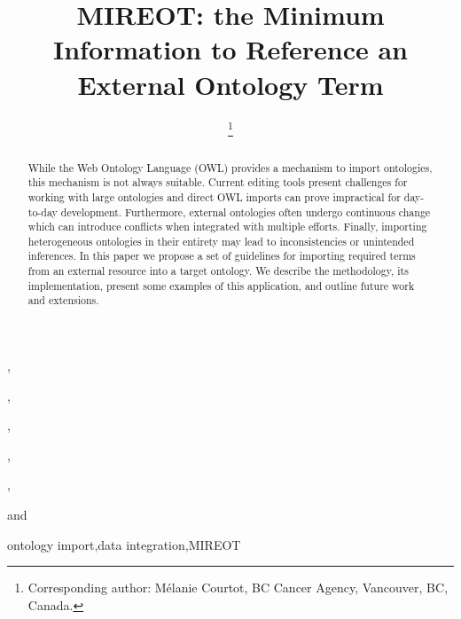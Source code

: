 \documentclass[jou]{ao2e}%
\begin{document}
\begin{frontmatter}                           %
%
\title{ MIREOT: the Minimum Information to Reference an External Ontology Term}

\author[A]{ %
\thanks{Corresponding author: M\'elanie Courtot, BC Cancer Agency, Vancouver, BC, Canada.}},
\author[B]{ },
\author[C]{ },
\author[D]{ },
\author[E]{ },
\author[A]{ }
and
\author[F]{ }

\address[A]{BC Cancer Agency, and Department of Medical Genetics, University of British Columbia, Vancouver, BC, Canada\\
E-mail: mcourtot@gmail.com, rbrinkman@bccrc.ca}

\address[B]{Abcam plc, 332 Cambridge Science Park, Cambridge, CB4 OWN, UK\\
E-mail: fgibson@gmail.com}

\address[C]{CISBAN and School of Computing Science, Newcastle University, Newcastle upon Tyne, UK\\
E-mail: a.l.lister@newcastle.ac.uk}

\address[D]{The European Bioinformatics Institute, Cambridge, CB10 1SD, UK\\
E-mail: malone@ebi.ac.uk}

\address[E]{Institute of Medical Biometry and Medical Informatics (IMBI), University Medical Center, 70104 Freiburg, Germany\\
E-mail: schober@imbi.uni-freiburg.de}

\address[F]{Science Commons, Cambridge, MA, USA\\
E-mail: alanruttenberg@gmail.com}


\begin{abstract}
While the Web Ontology Language (OWL) provides a mechanism to import ontologies, this mechanism is not always suitable.
Current editing tools present challenges for working with large ontologies and direct OWL imports can prove impractical for day-to-day development.
Furthermore, external ontologies often undergo continuous change which can introduce conflicts when integrated with multiple efforts.
Finally, importing heterogeneous ontologies in their entirety may lead to inconsistencies or unintended inferences.
In this paper we propose a set of guidelines for importing required terms from an external resource into a target ontology.
We describe the methodology, its implementation, present some examples of this application, and outline future work and extensions.
\end{abstract}


\begin{keyword}
ontology import\sep data integration\sep MIREOT
\end{keyword}

\end{frontmatter}
\end{document}
